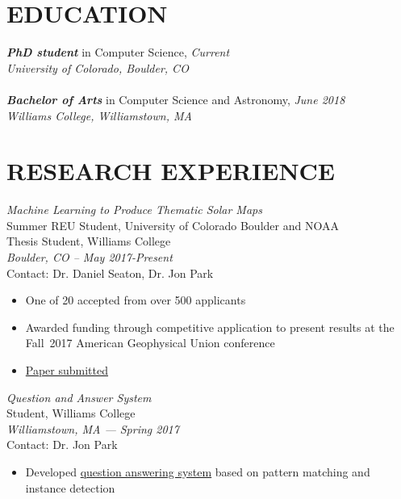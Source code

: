\documentclass[line,margin]{res}
\begin{document}
\address{880 36th Street, Boulder, CO 80303 at (270) 704-3055}
\address{\href{mailto:james.hughes-2@colorado.edu}{james.hughes-2@colorado.edu} and \href{https://jmbhughes.com}{jmbhughes.com}}

 
\begin{resume}
 
  
  \section{EDUCATION}
   {\sl \bf PhD student} in Computer Science, {\sl Current}\\
   {\sl University of Colorado, Boulder, CO}\\ \\
   {\sl \bf Bachelor of Arts} in Computer Science and Astronomy, {\sl June 2018} \\
   {\sl Williams College, Williamstown, MA}\\

  \section{RESEARCH EXPERIENCE}
  {\sl Machine Learning to Produce Thematic Solar Maps} \\
  Summer REU Student, University of Colorado Boulder and NOAA \\
  Thesis Student, Williams College \\ 
  {\it Boulder, CO -- May 2017-Present} \\
  Contact: Dr. Daniel Seaton, Dr. Jon Park \\
  \begin{itemize}
  \item One of 20 accepted from over 500 applicants
  \item Awarded funding through competitive application to present results at the Fall~2017 American
    Geophysical Union conference
   \item \href{https://github.com/jmbhughes/smachy/blob/master/paper/main.pdf}{Paper submitted}
  \end{itemize}
  
  {\sl Question and Answer System} \\
  Student, Williams College \\
  {\it Williamstown, MA --- Spring 2017} \\
  Contact: Dr. Jon Park \\
  \begin{itemize}
  \item Developed \href{https://github.com/jmbhughes/questionanswer}{question answering system} based on pattern matching and instance detection


\end{itemize}
\end{resume}
\end{document}
